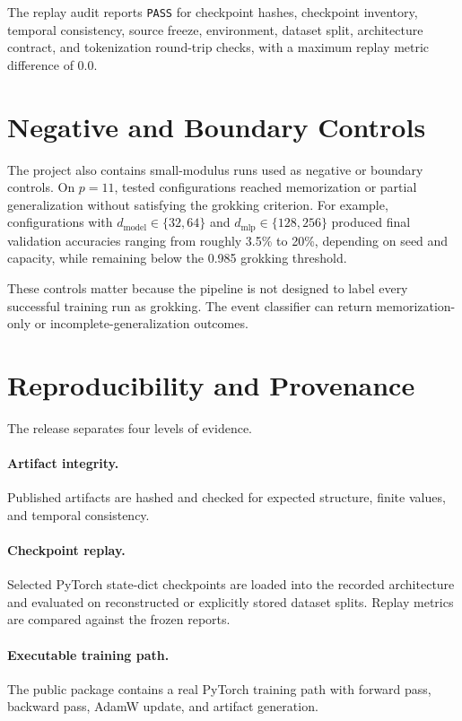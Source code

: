 \documentclass[11pt]{article}
\begin{document}
The replay audit reports \texttt{PASS} for checkpoint hashes, checkpoint inventory, temporal consistency, source freeze, environment, dataset split, architecture contract, and tokenization round-trip checks, with a maximum replay metric difference of 0.0.

\section{Negative and Boundary Controls}
The project also contains small-modulus runs used as negative or boundary controls. On $p=11$, tested configurations reached memorization or partial generalization without satisfying the grokking criterion. For example, configurations with $d_{\mathrm{model}}\in\{32,64\}$ and $d_{\mathrm{mlp}}\in\{128,256\}$ produced final validation accuracies ranging from roughly 3.5\% to 20\%, depending on seed and capacity, while remaining below the 0.985 grokking threshold.

These controls matter because the pipeline is not designed to label every successful training run as grokking. The event classifier can return memorization-only or incomplete-generalization outcomes.

\section{Reproducibility and Provenance}
The release separates four levels of evidence.

\paragraph{Artifact integrity.}
Published artifacts are hashed and checked for expected structure, finite values, and temporal consistency.

\paragraph{Checkpoint replay.}
Selected PyTorch state-dict checkpoints are loaded into the recorded architecture and evaluated on reconstructed or explicitly stored dataset splits. Replay metrics are compared against the frozen reports.

\paragraph{Executable training path.}
The public package contains a real PyTorch training path with forward pass, backward pass, AdamW update, and artifact generation.
\end{document}

